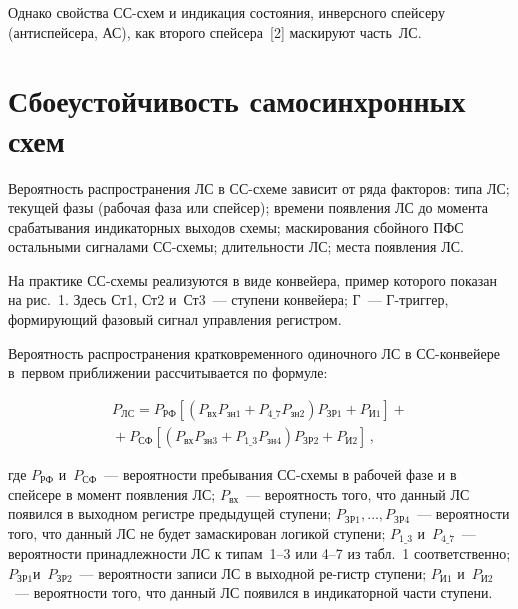 \begin{multicols}{2}
  Однако свойства СС-схем и индикация состояния, инверсного спейсеру 
(антиспейсера, АС), как второго спейсера~[2] маскируют часть~ЛС.




\section{Сбоеустойчивость самосинхронных схем}

  Вероятность распространения ЛС в СС-схе\-ме зависит от ряда факторов: 
типа ЛС; текущей фазы (рабочая фаза или спейсер); времени появления ЛС до 
момента срабатывания индикаторных выходов схемы; маскирования 
сбойного ПФС остальными сигналами 
  СС-схе\-мы; длительности ЛС; места появления ЛС.
  
  На практике СС-схе\-мы реализуются в виде конвейера, пример которого 
показан на рис.~1. Здесь Ст1, Ст2 и~Ст3~--- ступени конвейера; 
Г~--- Г-триг\-гер, формирующий фазовый сигнал управления ре\-гист\-ром.
   
  Вероятность распространения кратковременного одиночного ЛС в 
СС-кон\-вей\-ере в~первом приближении рассчитывается по формуле:

\noindent
  \begin{multline}
  P_{\mathrm{ЛС}}=P_{\mathrm{РФ}}\left[ \left( P_{\mathrm{вх}} 
P_{\mathrm{зн1}}+P_{4\mbox{\_}7}P_{\mathrm{зн2}}\right) 
P_{\mathrm{ЗР1}}+P_{\mathrm{И1}}\right]+{}\\
  {}+ P_{\mathrm{СФ}}\left[ \left( P_{\mathrm{вх}} 
P_{\mathrm{зн3}}+P_{1\mbox{\_}3}P_{\mathrm{зн4}}\right) 
P_{\mathrm{ЗР2}}+P_{\mathrm{И2}}\right]\,,
  \label{e3-step}
  \end{multline}
  
  \vspace*{-2pt}
  
  \noindent
где $ P_{\mathrm{РФ}}$ и~$P_{\mathrm{СФ}}$~--- вероятности пребывания 
СС-схе\-мы в рабочей фазе и в спейсере в момент появления ЛС; 
$P_{\mathrm{вх}}$~--- вероятность того, что данный ЛС появился в выходном 
регистре предыдущей ступени; $P_{\mathrm{ЗР1}},\ldots , 
P_{\mathrm{ЗР4}}$~--- вероятности того, что данный ЛС не будет 
замаскирован логикой ступени; $P_{1\mbox{\_}3}$ и~$P_{4\mbox{\_}7}$~--- вероятности 
принадлежности ЛС к типам~1--3 или 4--7 из табл.~1 соответственно; 
$P_{\mathrm{ЗР1}}$\linebreak и~$P_{\mathrm{ЗР2}}$~--- вероятности записи ЛС в выходной 
ре-\linebreak гистр ступени; $P_{\mathrm{И1}}$ и~$P_{\mathrm{И2}}$~--- вероятности того, что 
данный ЛС появился в индикаторной части сту\-пени.


\end{multicols}

